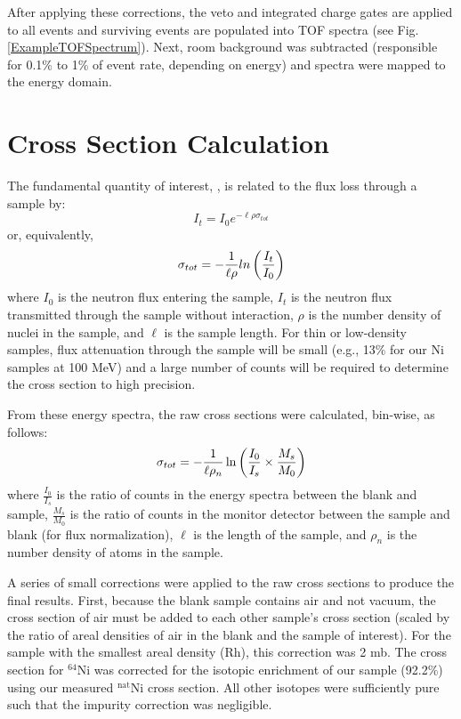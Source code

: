 After applying these corrections, the veto and integrated charge gates are applied to 
all events and surviving events are populated into TOF spectra (see Fig.
\ref{ExampleTOFSpectrum}). Next, room background was subtracted (responsible for 0.1\% to 
1\% of event rate, depending on energy) and spectra were mapped to the energy domain.

\section{Cross Section Calculation}
The fundamental quantity of interest, \tot, is related to the flux
loss through a sample by:
\begin{equation}
I_{t} = I_{0}e^{-{\ell\rho\sigma_{tot}}}
\end{equation}
or, equivalently,
\begin{equation}
    \sigma_{tot} = -\frac{1}{\ell\rho}ln\left(\frac{I_{t}}{I_{0}}\right)
\end{equation}
where $I_{0}$ is the neutron flux entering the sample, $I_{t}$ is the neutron
flux transmitted through the sample without interaction, $\rho$ is the number
density of nuclei in the sample, and $\ell$ is the sample length. For thin
or low-density samples, flux attenuation through the sample will be small
(e.g., 13\% for our Ni samples at 100 MeV) and a large number
of counts will be required to determine the cross section to high
precision.

From these energy spectra, the raw cross sections were calculated, bin-wise, as follows:
$$
\sigma_{tot} = -\frac{1}{\ell\rho_{n}}
\ln \left(\frac{I_{0}}{I_{s}}\times\frac{M_{s}}{M_{0}}\right)
$$
where $\frac{I_{0}}{I_{s}}$ is the ratio of counts in the energy spectra between 
the blank and sample, $\frac{M_{s}}{M_{0}}$ is the ratio of counts in the
monitor detector between the sample and blank (for flux normalization), $\ell$ is the length 
of the sample, and $\rho_{n}$ is the number density of atoms in the sample.

A series of small corrections were applied to the raw cross sections to produce
the final results. First, because the blank sample contains air and not vacuum,
the cross section of air must be added to each other sample's cross section (scaled by  
the ratio of areal densities of air in the blank and the sample of interest).
For the sample with the smallest areal density (Rh), this correction was 2 mb.
The cross section for $^{64}$Ni was corrected for the isotopic enrichment of our
sample (92.2\%) using our measured $^{\text{nat}}$Ni cross section. All other isotopes were 
sufficiently pure such that the impurity correction was negligible.

